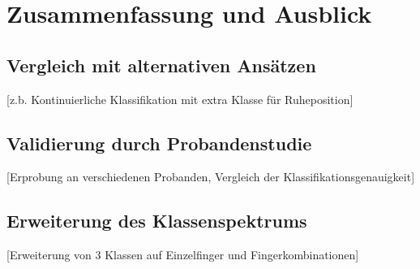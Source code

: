 \section{Zusammenfassung und Ausblick}
\label{sec:ausblick}
    \subsection{Vergleich mit alternativen Ansätzen}
    [z.b. Kontinuierliche Klassifikation mit extra Klasse für Ruheposition]

    \subsection{Validierung durch Probandenstudie}
    [Erprobung an verschiedenen Probanden, Vergleich der Klassifikationsgenauigkeit]

    \subsection{Erweiterung des Klassenspektrums}
    [Erweiterung von 3 Klassen auf Einzelfinger und Fingerkombinationen]
